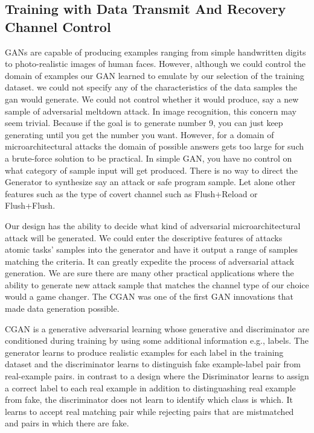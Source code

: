  \subsection{Training with Data Transmit And Recovery Channel Control}
 GANs are capable of producing examples ranging from simple handwritten digits to photo-realistic images of human faces. However, although we could control the domain of examples our GAN learned to emulate by our selection of the training dataset. we could not specify any of the characteristics of the data samples the gan would generate. We could not control whether it would produce, say a new sample of adversarial meltdown attack. In image recognition, this concern may seem trivial. Because if the goal is to generate number 9, you can just keep generating until you get the number you want. However, for a domain of microarchitectural attacks the domain of possible answers gets too large for such a brute-force solution to be practical. In simple GAN, you have no control on what category of sample input will get produced. There is no way to direct the Generator to synthesize say an attack or safe program sample. Let alone other features such as the type of covert channel such as Flush+Reload or Flush+Flush.
 
 Our design has the ability to decide what kind of adversarial microarchitectural attack will be generated. We could enter the descriptive features of attacks atomic tasks' samples into the generator and have it output a range of samples matching the criteria. It can greatly expedite the process of adversarial attack generation. We are sure there are many other practical applications where the ability to generate new attack sample that matches the channel type of our choice would a game changer. The CGAN was one of the first GAN innovations that made data generation possible. 
 
 CGAN is a generative adversarial learning whose generative and discriminator are conditioned during training by using some additional information e.g., labels. 
 The generator learns to produce realistic examples for each label in the training dataset and the discriminator learns to distinguish fake example-label pair from real-example pairs.   
 in contrast to a design where the Disriminator learns to assign a correct label to each real example in addition to distinguashing real example from fake, the discriminator does not learn to identify which class is which.  It learns to accept real matching pair while rejecting pairs that are mistmatched and pairs in which there are fake. 
 
